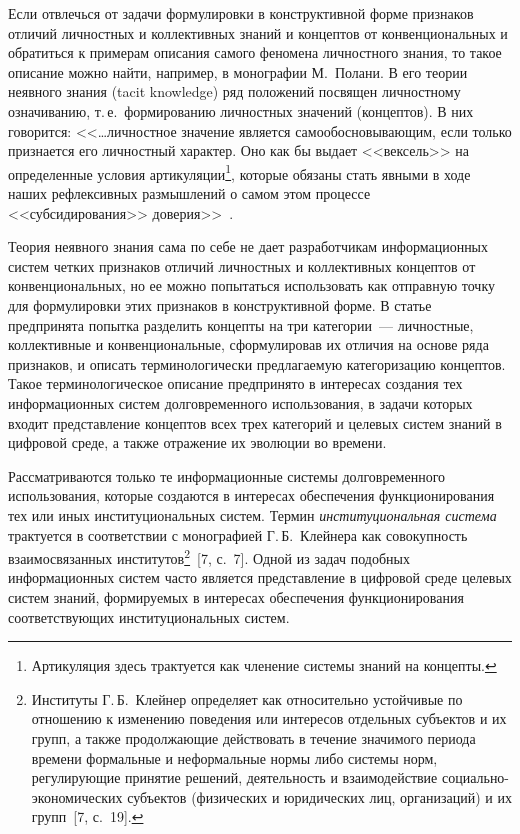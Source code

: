\begin{multicols}{2}
   Если отвлечься от задачи формулировки в конструктивной форме признаков отличий
личностных и коллективных знаний и концептов от конвенциональных и обратиться к
примерам описания самого феномена личностного знания, то такое описание можно найти,
например, в монографии М.~Полани. В его теории неявного знания (tacit knowledge) ряд
положений посвящен личностному означиванию, т.\,е.\ формированию личностных значений
(концептов). В них говорится: <<\ldots личностное значение является самообосновывающим,
если только признается его личностный характер. Оно как бы выдает <<вексель>> на
определенные условия артикуляции\footnote[2]{Артикуляция здесь трактуется как членение системы
знаний на концепты.}, которые обязаны стать явными в ходе наших рефлексивных
размышлений о самом этом процессе <<субсидирования>> доверия>>~\cite{6za}.

   Теория неявного знания сама по себе не \mbox{дает} %
   разра\-бот\-чи\-кам информационных систем
четких признаков отличий личностных и коллективных концептов от конвенциональных, но
ее можно попытаться использовать как отправную точку для формулировки этих признаков в
конструктивной форме. 
В статье предпринята попытка разделить концепты на три
категории~--- личностные, кол\-лек\-тив\-ные и конвенциональные, сформулировав их отличия
на основе ряда признаков, и \mbox{описать} терми\-но\-ло\-ги\-че\-ски предлагаемую ка\-те\-го\-ри\-за\-цию
концептов. Такое терминологическое описание предпринято в интересах создания тех %
инфор\-ма\-ци\-он\-ных систем долговременного использования, в задачи которых входит
представление концептов всех трех категорий и целевых сис\-тем знаний в циф\-ро\-вой среде, а
также отражение их эволюции во времени.

   Рассматриваются только те информационные системы долговременного использования,
которые создаются в интересах обеспечения функционирования тех или иных
институциональных систем. Термин \textit{институциональная сис\-те\-ма} трактуется в
соответствии с монографией Г.\,Б.~Клейнера как совокупность взаимосвязанных
институтов\footnote[3]{Институты Г.\,Б.~Клейнер определяет как относительно устойчивые по отношению
к изменению поведения или интересов отдельных субъектов и их групп, а также продолжающие действовать
в течение значимого периода времени формальные и неформальные нормы либо системы норм, регулирующие
принятие решений, деятельность и взаимодействие социально-экономических субъектов (физических и
юридических лиц, организаций) и их групп~[7, с.~19].}~[7, с.~7]. Одной из задач подобных
информационных систем часто является представление в цифровой среде целевых систем
знаний, формируемых в интересах обеспечения функционирования соответствующих
институциональных систем.


\end{multicols}

